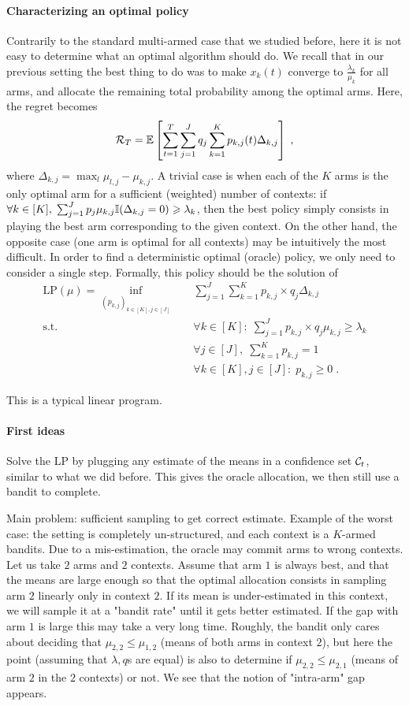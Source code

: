 \paragraph{Characterizing an optimal policy} Contrarily to the standard multi-armed case that we studied before, here it is not easy to determine what an optimal algorithm should do. We recall that in our previous setting the best thing to do was to make $x_k(t)$ converge to $\frac{\lambda_k}{\mu_k}$ for all arms, and allocate the remaining total probability among the optimal arms. Here, the regret becomes 
\[\mathcal{R}_T = \mathbb{E}\left[\sum_{t=1}^T \sum_{j=1}^J q_j \sum_{k=1}^K p_{k,j}(t)\Delta_{k,j}\right]\;, \]
where $\Delta_{k, j}=\max_{l} \mu_{l, j} - \mu_{k,j}$. A trivial case is when each of the $K$ arms is the only optimal arm for a sufficient (weighted) number of contexts: if $\forall k \in [K], \;\sum_{j=1}^J p_j \mu_{k,j} \mathbb{I}(\Delta_{k,j}=0)\geqslant \lambda_k$, then the best policy simply consists in playing the best arm corresponding to the given context. On the other hand, the opposite case (one arm is optimal for all contexts) may be intuitively the most difficult. In order to find a deterministic optimal (oracle) policy, we only need to consider a single step. Formally, this policy should be the solution of 
\begin{align*}
\text{LP}(\mu)= \inf_{(p_{k,j})_{k \in [K], j \in [J]}} \quad & \sum_{j=1}^J  \sum_{k=1}^K p_{k,j}\times  q_j\Delta_{k, j}\\
\textrm{s.t.} \quad & \forall k \in [K]: \; \sum_{j=1}^J p_{k,j} \times q_j \mu_{k, j} \geq \lambda_k\\
& \forall j \in [J], \; \sum_{k=1}^K p_{k,j} =1 \\
& \forall k \in [K], j \in [J]: \; p_{k,j} \geq 0 \;.
\end{align*}

This is a typical linear program.

\paragraph{First ideas} Solve the LP by plugging any estimate of the means in a confidence set $\mathcal{C}_t$, similar to what we did before. This gives the oracle allocation, we then still use a bandit to complete. 

Main problem: sufficient sampling to get correct estimate. Example of the worst case: the setting is completely un-structured, and each context is a $K$-armed bandits. Due to a mis-estimation, the oracle may commit arms to wrong contexts. Let us take $2$ arms and $2$ contexts. Assume that arm $1$ is always best, and that the means are large enough so that the optimal allocation consists in sampling arm $2$ linearly only in context $2$. If its mean is under-estimated in this context, we will sample it at a "bandit rate" until it gets better estimated. If the gap with arm $1$ is large this may take a very long time. Roughly, the bandit only cares about deciding that $\mu_{2,2}\leq \mu_{1, 2} $ (means of both arms in context $2$), but here the point (assuming that $\lambda,q$s are equal) is also to determine if $\mu_{2,2}\leq \mu_{2,1}$ (means of arm $2$ in the $2$ contexts) or not. We see that the notion of "intra-arm" gap appears.

